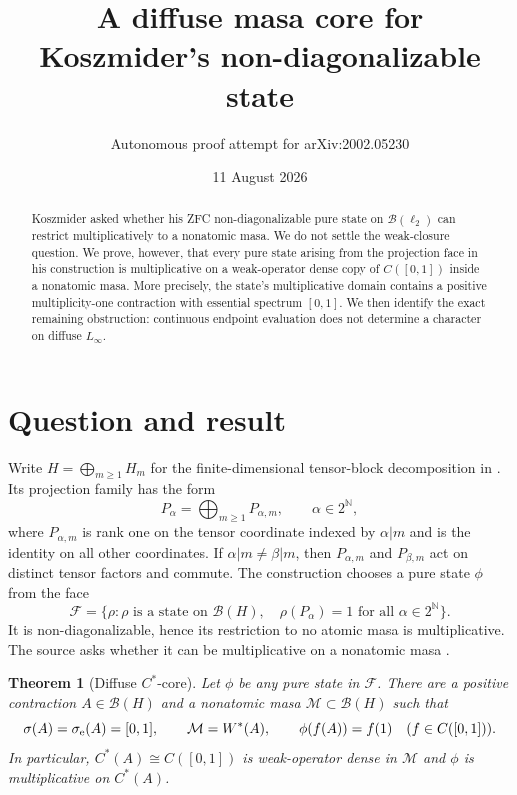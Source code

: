 \documentclass[11pt]{article}
\title{A diffuse masa core for Koszmider's non-diagonalizable state}
\author{Autonomous proof attempt for arXiv:2002.05230}
\date{11 August 2026}
\newtheorem{theorem}{Theorem}
\newcommand{\B}{\mathcal B}
\newcommand{\N}{\mathbb N}
\begin{document}
\maketitle

\begin{abstract}
Koszmider asked whether his ZFC non-diagonalizable pure state on
$\B(\ell_2)$ can restrict multiplicatively to a nonatomic masa.  We do not
settle the weak-closure question.  We prove, however, that every pure state
arising from the projection face in his construction is multiplicative on a
weak-operator dense copy of $C([0,1])$ inside a nonatomic masa.  More
precisely, the state's multiplicative domain contains a positive
multiplicity-one contraction with essential spectrum $[0,1]$.  We then
identify the exact remaining obstruction: continuous endpoint evaluation
does not determine a character on diffuse $L_\infty$.
\end{abstract}

\section{Question and result}

Write $H=\bigoplus_{m\ge1}H_m$ for the finite-dimensional tensor-block
decomposition in \cite{Koszmider}.  Its projection family has the form
\[
 P_\alpha=\bigoplus_{m\ge1}P_{\alpha,m},\qquad \alpha\in2^\N,
\]
where $P_{\alpha,m}$ is rank one on the tensor coordinate indexed by
$\alpha|m$ and is the identity on all other coordinates.  If
$\alpha|m\ne\beta|m$, then $P_{\alpha,m}$ and $P_{\beta,m}$ act on distinct
tensor factors and commute.  The construction chooses a pure state $\phi$
from the face
\[
 \mathcal F=\{\rho:\rho\text{ is a state on }\B(H),\quad
                    \rho(P_\alpha)=1\text{ for all }\alpha\in2^\N\}.
\]
It is non-diagonalizable, hence its restriction to no atomic masa is
multiplicative.  The source asks whether it can be multiplicative on a
nonatomic masa \cite[p.~2]{Koszmider}.

\begin{theorem}[Diffuse $C^*$-core]\label{thm:main}
Let $\phi$ be any pure state in $\mathcal F$.  There are a positive
contraction $A\in\B(H)$ and a nonatomic masa $\mathcal M\subset\B(H)$ such
that
\[
 \sigma(A)=\sigma_{\rm e}(A)=[0,1],\qquad
 \mathcal M=W^*(A),\qquad
 \phi(f(A))=f(1)\quad(f\in C([0,1])).
\]
In particular, $C^*(A)\cong C([0,1])$ is weak-operator dense in $\mathcal M$
and $\phi$ is multiplicative on $C^*(A)$.
\end{theorem}
\end{document}
